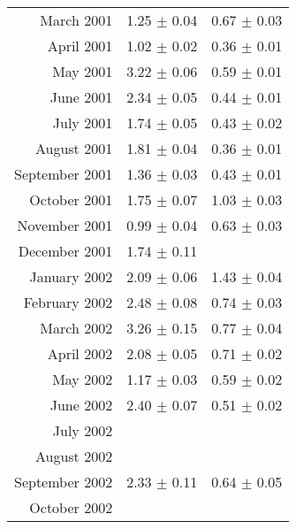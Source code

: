 \documentclass[a4paper,12pt]{article}
\begin{document}
\begin{center}
\begin{longtable}{|r|c|c|}
    March       2001    &       1.25    $\pm$   0.04    &       0.67    $\pm$   0.03    \\
    April       2001    &       1.02    $\pm$   0.02    &       0.36    $\pm$   0.01    \\
    May         2001    &       3.22    $\pm$   0.06    &       0.59    $\pm$   0.01    \\
    June        2001    &       2.34    $\pm$   0.05    &       0.44    $\pm$   0.01    \\
    July        2001    &       1.74    $\pm$   0.05    &       0.43    $\pm$   0.02    \\
    August      2001    &       1.81    $\pm$   0.04    &       0.36    $\pm$   0.01    \\
    September   2001    &       1.36    $\pm$   0.03    &       0.43    $\pm$   0.01    \\
    October     2001    &       1.75    $\pm$   0.07    &       1.03    $\pm$   0.03    \\
    November    2001    &       0.99    $\pm$   0.04    &       0.63    $\pm$   0.03    \\
    December    2001    &       1.74    $\pm$   0.11    &                               \\
    January     2002    &       2.09    $\pm$   0.06    &       1.43    $\pm$   0.04    \\
    February    2002    &       2.48    $\pm$   0.08    &       0.74    $\pm$   0.03    \\
    March       2002    &       3.26    $\pm$   0.15    &       0.77    $\pm$   0.04    \\
    April       2002    &       2.08    $\pm$   0.05    &       0.71    $\pm$   0.02    \\
    May         2002    &       1.17    $\pm$   0.03    &       0.59    $\pm$   0.02    \\
    June        2002    &       2.40    $\pm$   0.07    &       0.51    $\pm$   0.02    \\
    July        2002    &                               &                               \\
    August      2002    &                               &                               \\
    September   2002    &       2.33    $\pm$   0.11    &       0.64    $\pm$   0.05    \\
    October     2002    &                               &                               \\

\end{longtable}
\end{center}
\end{document}
